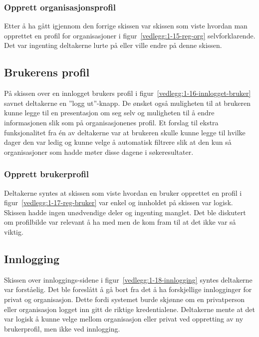 \subsubsection{Opprett organisasjonsprofil}

Etter å ha gått igjennom den forrige skissen var skissen som viste hvordan man opprettet en profil for organisasjoner i figur~\ref{vedlegg:1-15-reg-org} selvforklarende. Det var ingenting deltakerne lurte på eller ville endre på denne skissen.

\subsection{Brukerens profil}

På skissen over en innlogget brukers profil i figur~\ref{vedlegg:1-16-innlogget-bruker} savnet deltakerne en ''logg ut''-knapp. De ønsket også muligheten til at brukeren kunne legge til en presentasjon om seg selv og muligheten til å endre informasjonen slik som på organisasjonenes profil. Et forslag til ekstra funksjonalitet fra én av deltakerne var at brukeren skulle kunne legge til hvilke dager den var ledig og kunne velge å automatisk filtrere slik at den kun så organisasjoner som hadde møter disse dagene i søkeresultater.


\subsubsection{Opprett brukerprofil}

Deltakerne syntes at skissen som viste hvordan en bruker opprettet en profil i figur~\ref{vedlegg:1-17-reg-bruker} var enkel og innholdet på skissen var logisk. Skissen hadde ingen unødvendige deler og ingenting manglet. Det ble diskutert om profilbilde var relevant å ha med men de kom fram til at det ikke var så viktig. 


\subsection{Innlogging}

Skissen over innloggings-sidene i figur~\ref{vedlegg:1-18-innlogging} syntes deltakerne var forståelig. Det ble foreslått å gå bort fra det å ha forskjellige innlogginger for privat og organisasjon. Dette fordi systemet burde skjønne om en privatperson eller organisasjon logget inn gitt de riktige kredentialene. Deltakerne mente at det var logisk å kunne velge mellom organisasjon eller privat ved oppretting av ny brukerprofil, men ikke ved innlogging.


